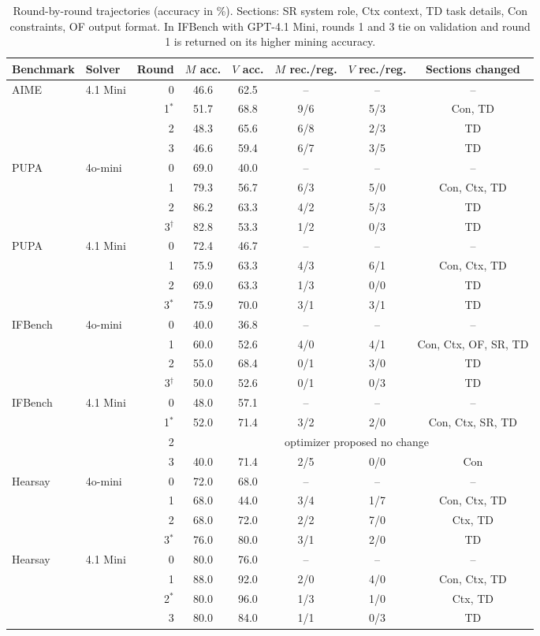 \documentclass[11pt]{article}
\begin{document}
\begin{table}[!tp]
\centering
\small
\setlength{\tabcolsep}{4pt}
\begin{tabular}{llrccccc}
\toprule
\rowcolor{midblue}Benchmark & Solver & Round & $M$ acc. & $V$ acc. & $M$ rec./reg. & $V$ rec./reg. & Sections changed \\
\midrule
AIME & 4.1 Mini & 0 & 46.6 & 62.5 & -- & -- & -- \\
 & & 1$^*$ & 51.7 & 68.8 & 9/6 & 5/3 & Con, TD \\
 & & 2 & 48.3 & 65.6 & 6/8 & 2/3 & TD \\
 & & 3 & 46.6 & 59.4 & 6/7 & 3/5 & TD \\
\midrule
PUPA & 4o-mini & 0 & 69.0 & 40.0 & -- & -- & -- \\
 & & 1 & 79.3 & 56.7 & 6/3 & 5/0 & Con, Ctx, TD \\
 & & 2 & 86.2 & 63.3 & 4/2 & 5/3 & TD \\
 & & 3$^\dagger$ & 82.8 & 53.3 & 1/2 & 0/3 & TD \\
\midrule
PUPA & 4.1 Mini & 0 & 72.4 & 46.7 & -- & -- & -- \\
 & & 1 & 75.9 & 63.3 & 4/3 & 6/1 & Con, Ctx, TD \\
 & & 2 & 69.0 & 63.3 & 1/3 & 0/0 & TD \\
 & & 3$^*$ & 75.9 & 70.0 & 3/1 & 3/1 & TD \\
\midrule
IFBench & 4o-mini & 0 & 40.0 & 36.8 & -- & -- & -- \\
 & & 1 & 60.0 & 52.6 & 4/0 & 4/1 & Con, Ctx, OF, SR, TD \\
 & & 2 & 55.0 & 68.4 & 0/1 & 3/0 & TD \\
 & & 3$^\dagger$ & 50.0 & 52.6 & 0/1 & 0/3 & TD \\
\midrule
IFBench & 4.1 Mini & 0 & 48.0 & 57.1 & -- & -- & -- \\
 & & 1$^*$ & 52.0 & 71.4 & 3/2 & 2/0 & Con, Ctx, SR, TD \\
 & & 2 & \multicolumn{5}{c}{optimizer proposed no change} \\
 & & 3 & 40.0 & 71.4 & 2/5 & 0/0 & Con \\
\midrule
Hearsay & 4o-mini & 0 & 72.0 & 68.0 & -- & -- & -- \\
 & & 1 & 68.0 & 44.0 & 3/4 & 1/7 & Con, Ctx, TD \\
 & & 2 & 68.0 & 72.0 & 2/2 & 7/0 & Ctx, TD \\
 & & 3$^*$ & 76.0 & 80.0 & 3/1 & 2/0 & TD \\
\midrule
Hearsay & 4.1 Mini & 0 & 80.0 & 76.0 & -- & -- & -- \\
 & & 1 & 88.0 & 92.0 & 2/0 & 4/0 & Con, Ctx, TD \\
 & & 2$^*$ & 80.0 & 96.0 & 1/3 & 1/0 & Ctx, TD \\
 & & 3 & 80.0 & 84.0 & 1/1 & 0/3 & TD \\
\bottomrule
\end{tabular}
\caption{Round-by-round trajectories (accuracy in \%). Sections: SR system role, Ctx context, TD task details,
Con constraints, OF output format. In IFBench with GPT-4.1 Mini, rounds 1 and 3 tie on validation and round 1
is returned on its higher mining accuracy.}
\label{tab:rounds}
\end{table}
\end{document}
